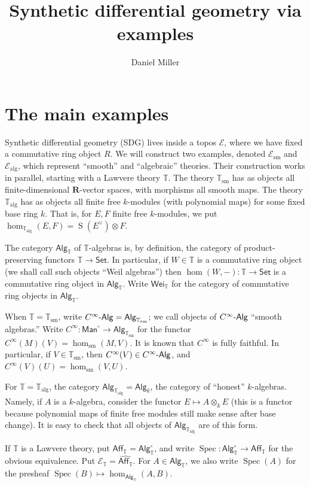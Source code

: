 \documentclass{article}
\title{Synthetic differential geometry via examples}
\author{Daniel Miller}
\DeclareMathOperator{\spec}{Spec}
\DeclareMathOperator{\sym}{S}
\newcommand{\bR}{\mathbf{R}}
\newcommand{\cE}{\mathcal{E}}
\newcommand{\dT}{\mathbb{T}}
\newcommand{\alg}{\mathrm{alg}}
\newcommand{\Aff}{\mathsf{Aff}}
\newcommand{\Alg}{\mathsf{Alg}}
\newcommand{\Cinfty}{C^\infty\textnormal{-}\mathsf{Alg}}
\newcommand{\Man}{\mathsf{Man}}
\newcommand{\Sets}{\mathsf{Set}}
\newcommand{\sm}{\mathrm{sm}}
\newcommand{\Weil}{\mathsf{Wei}}
\begin{document}
\maketitle





\section{The main examples}

Synthetic differential geometry (SDG) lives inside a topos $\cE$, where we have 
fixed a commutative ring object $R$. We will construct two examples, denoted 
$\cE_\sm$ and $\cE_\alg$, which represent ``smooth'' and ``algebraic'' 
theories. Their construction works in parallel, starting with a Lawvere theory 
$\dT$. The theory $\dT_\sm$ has as objects all finite-dimensional $\bR$-vector 
spaces, with morphisms all smooth maps. The theory $\dT_\alg$ has as objects 
all finite free $k$-modules (with polynomial maps) for some fixed base ring 
$k$. That is, for $E,F$ finite free $k$-modules, we put 
$\hom_{\dT_\alg}(E,F) = \sym(E^\vee)\otimes F$. 

The category $\Alg_\dT$ of $\dT$-algebras is, by definition, the category 
of product-preserving functors $\dT\to\Sets$. In particular, if $W\in \dT$ is a 
commutative ring object (we shall call such objects ``Weil algebras'') then 
$\hom(W,-)\colon \dT\to \Sets$ is a commutative ring object in $\Alg_\dT$. 
Write $\Weil_\dT$ for the category of commutative ring objects in $\Alg_\dT$. 

When $\dT=\dT_\sm$, write $\Cinfty=\Alg_{\dT_\sm}$; we call objects of 
$\Cinfty$ ``smooth algebras.'' Write $C^\infty\colon \Man^\circ\to \Alg_{\dT_\sm}$ 
for the functor $C^\infty(M)(V) = \hom_\sm(M,V)$. It is known that $C^\infty$ 
is fully faithful. In particular, if $V\in \dT_\sm$, then 
$C^\infty(V)\in \Cinfty$, and $C^\infty(V)(U) = \hom_\sm(V,U)$. 

For $\dT=\dT_\alg$, the category $\Alg_{\dT_\alg}=\Alg_k$, the category of 
``honest'' $k$-algebras. Namely, if $A$ is a $k$-algebra, consider the functor 
$E\mapsto A\otimes_k E$ (this is a functor because polynomial maps of finite 
free modules still make sense after base change). It is easy to check that all 
objects of $\Alg_{\dT_\alg}$ are of this form. 

If $\dT$ is a Lawvere theory, put $\Aff_\dT=\Alg_\dT^\circ$, and write 
$\spec\colon \Alg_\dT^\circ\to \Aff_\dT$ for the obvious equivalence. Put 
$\cE_\dT=\widehat{\Aff_\dT}$. For $A\in \Alg_\dT$, we also write $\spec(A)$ for 
the presheaf $\spec(B)\mapsto \hom_{\Alg_\dT}(A,B)$. 
\end{document}
